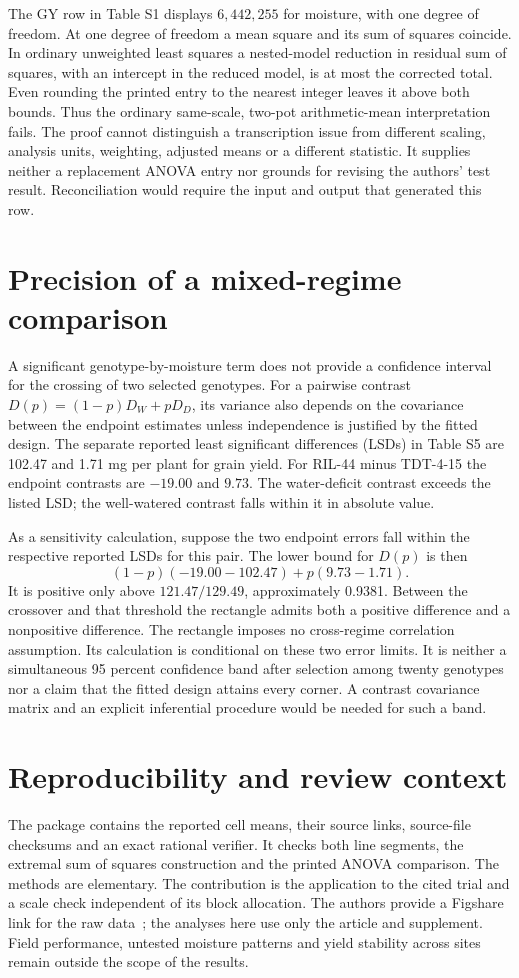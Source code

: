 \documentclass[11pt]{article}
\begin{document}
The GY row in Table S1 displays $6{,}442{,}255$ for moisture, with one degree of freedom. At one degree of freedom a mean square and its sum of squares coincide. In ordinary unweighted least squares a nested-model reduction in residual sum of squares, with an intercept in the reduced model, is at most the corrected total. Even rounding the printed entry to the nearest integer leaves it above both bounds. Thus the ordinary same-scale, two-pot arithmetic-mean interpretation fails. The proof cannot distinguish a transcription issue from different scaling, analysis units, weighting, adjusted means or a different statistic. It supplies neither a replacement ANOVA entry nor grounds for revising the authors' test result. Reconciliation would require the input and output that generated this row.

\section{Precision of a mixed-regime comparison}
A significant genotype-by-moisture term does not provide a confidence interval for the crossing of two selected genotypes. For a pairwise contrast $D(p)=(1-p)D_W+p D_D$, its variance also depends on the covariance between the endpoint estimates unless independence is justified by the fitted design. The separate reported least significant differences (LSDs) in Table S5 are 102.47 and 1.71 mg per plant for grain yield. For RIL-44 minus TDT-4-15 the endpoint contrasts are $-19.00$ and $9.73$. The water-deficit contrast exceeds the listed LSD; the well-watered contrast falls within it in absolute value.

As a sensitivity calculation, suppose the two endpoint errors fall within the respective reported LSDs for this pair. The lower bound for $D(p)$ is then
\[
 (1-p)(-19.00-102.47)+p(9.73-1.71).
\]
It is positive only above $121.47/129.49$, approximately 0.9381. Between the crossover and that threshold the rectangle admits both a positive difference and a nonpositive difference. The rectangle imposes no cross-regime correlation assumption. Its calculation is conditional on these two error limits. It is neither a simultaneous 95 percent confidence band after selection among twenty genotypes nor a claim that the fitted design attains every corner. A contrast covariance matrix and an explicit inferential procedure would be needed for such a band.

\section{Reproducibility and review context}
The package contains the reported cell means, their source links, source-file checksums and an exact rational verifier. It checks both line segments, the extremal sum of squares construction and the printed ANOVA comparison. The methods are elementary. The contribution is the application to the cited trial and a scale check independent of its block allocation. The authors provide a Figshare link for the raw data~\cite{data}; the analyses here use only the article and supplement. Field performance, untested moisture patterns and yield stability across sites remain outside the scope of the results.
\end{document}
